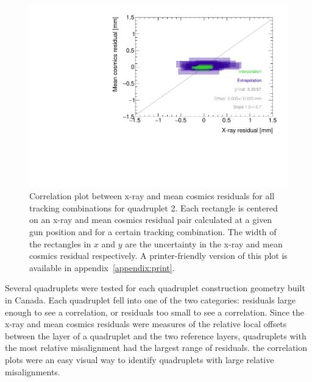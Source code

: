 \begin{figure}
    \centering
    \includegraphics[width = \textwidth]{figures/figure_QL2P08_3100V_2021-08-16_QL2P08_local_cosmic_and_xray_data_correlation_plot.pdf}
    \caption{Correlation plot between x-ray and mean cosmics residuals for all tracking combinations for quadruplet 2. Each rectangle is centered on an x-ray and mean cosmics residual pair calculated at a given gun position and for a certain tracking combination. The width of the rectangles in $x$ and $y$ are the uncertainty in the x-ray and mean cosmics residual respectively. A printer-friendly version of this plot is available in appendix~\ref{appendix:print}.}
    \label{fig:no_correlation}
\end{figure}

Several quadruplets were tested for each quadruplet construction geometry built in Canada. Each quadruplet fell into one of the two categories: residuals large enough to see a correlation, or residuals too small to see a correlation. Since the x-ray and mean cosmics residuals were measures of the relative local offsets between the layer of a quadruplet and the two reference layers, quadruplets with the most relative misalignment had the largest range of residuals. the correlation plots were an easy visual way to identify quadruplets with large relative misalignments.

